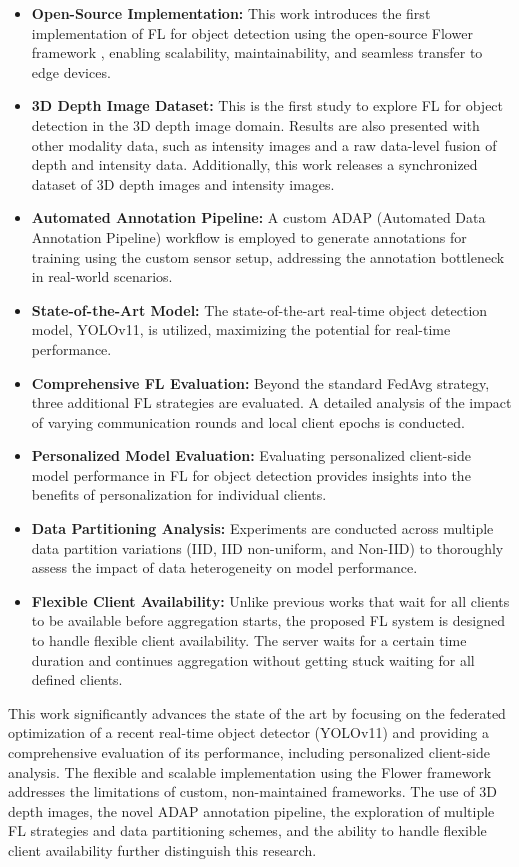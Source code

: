 \documentclass[thesis]{mas_proposal}
\begin{document}
\begin{itemize}
      \item \textbf{Open-Source Implementation:}  This work introduces the first implementation of FL for object detection using the open-source Flower framework \cite{beutel2020flower}, enabling scalability, maintainability, and seamless transfer to edge devices.
      \item \textbf{3D Depth Image Dataset:} This is the first study to explore FL for object detection in the 3D depth image domain. Results are also presented with other modality data, such as intensity images and a raw data-level fusion of depth and intensity data. Additionally, this work releases a synchronized dataset of 3D depth images and intensity images.
      \item \textbf{Automated Annotation Pipeline:} A custom ADAP (Automated Data Annotation Pipeline) workflow is employed to generate annotations for training using the custom sensor setup, addressing the annotation bottleneck in real-world scenarios.
      \item \textbf{State-of-the-Art Model:} The state-of-the-art real-time object detection model, YOLOv11, is utilized, maximizing the potential for real-time performance.
      \item \textbf{Comprehensive FL Evaluation:}  Beyond the standard FedAvg strategy, three additional FL strategies are evaluated. A detailed analysis of the impact of varying communication rounds and local client epochs is conducted.
      \item \textbf{Personalized Model Evaluation:} Evaluating personalized client-side model performance in FL for object detection provides insights into the benefits of personalization for individual clients.
      \item \textbf{Data Partitioning Analysis:}  Experiments are conducted across multiple data partition variations (IID, IID non-uniform, and Non-IID) to thoroughly assess the impact of data heterogeneity on model performance.
      \item \textbf{Flexible Client Availability:} Unlike previous works that wait for all clients to be available before aggregation starts, the proposed FL system is designed to handle flexible client availability. The server waits for a certain time duration and continues aggregation without getting stuck waiting for all defined clients.
\end{itemize}

This work significantly advances the state of the art by focusing on the federated optimization of a recent real-time object detector (YOLOv11) and providing a comprehensive evaluation of its performance, including personalized client-side analysis. The flexible and scalable implementation using the Flower framework addresses the limitations of custom, non-maintained frameworks. The use of 3D depth images, the novel ADAP annotation pipeline, the exploration of multiple FL strategies and data partitioning schemes, and the ability to handle flexible client availability further distinguish this research.
\end{document}
